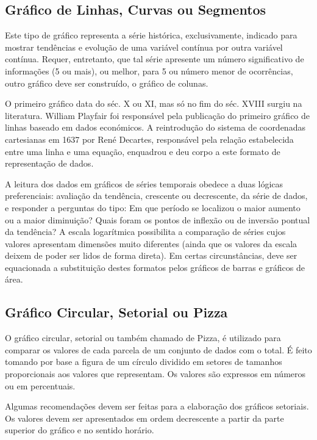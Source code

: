 \subsection{Gráfico de Linhas, Curvas ou Segmentos}

Este tipo de gráfico representa a série histórica, exclusivamente,
indicado para mostrar tendências e evolução de uma variável
contínua por outra variável contínua. Requer, entretanto, que tal
série apresente um número significativo de informações (5 ou
mais), ou melhor, para 5 ou número menor de ocorrências, outro
gráfico deve ser construído, o gráfico de colunas.\vskip0.3cm

O primeiro gráfico data do séc. X ou XI, mas só no fim do séc. XVIII surgiu na literatura. William Playfair foi responsável pela publicação do primeiro gráfico de linhas baseado em dados económicos. A reintrodução do sistema de coordenadas cartesianas em 1637 por René Decartes, responsável pela relação estabelecida entre uma linha e uma equação, enquadrou e deu corpo a este formato de representação de dados.\vskip0.3cm

A leitura dos dados em gráficos de séries temporais obedece a duas lógicas preferenciais: avaliação da tendência, crescente ou decrescente, da série de dados, e responder a perguntas do tipo: Em que período se localizou o maior aumento ou a maior diminuição? Quais foram os pontos de inflexão ou de inversão pontual da tendência? A escala logarítmica possibilita a comparação de séries cujos valores apresentam dimensões muito diferentes (ainda que os valores da escala deixem de poder ser lidos de forma direta). Em certas circunstâncias, deve ser equacionada a substituição destes formatos pelos gráficos de barras e gráficos de área.


\subsection{Gráfico Circular, Setorial ou Pizza}

O gráfico circular, setorial ou também chamado de Pizza, é
utilizado para comparar os valores de cada parcela de um conjunto
de dados com o total. É feito tomando por base a figura de um
círculo dividido em setores de tamanhos proporcionais aos valores
que representam. Os valores são expressos em números ou em percentuais. \vskip0.3cm

Algumas recomendações devem ser feitas para a elaboração dos
gráficos setoriais. Os valores devem ser apresentados em ordem
decrescente a partir da parte superior do gráfico e no sentido
horário.\vskip0.3cm

